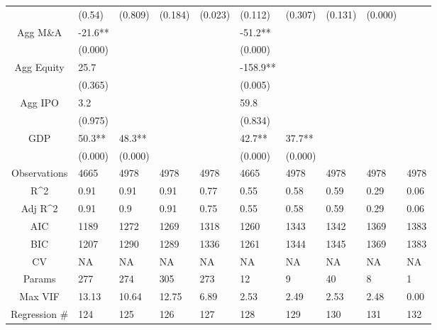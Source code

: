 \documentclass{article}
\begin{document}
\begin{table}[H]
\begin{tabular}{|clllllllll|}
   & (0.54) & (0.809) & (0.184) & (0.023) & (0.112) & (0.307) & (0.131) & (0.000) &  \\ 
  Agg M\&A & -21.6** &  &  &  & -51.2** &  &  &  &  \\ 
   & (0.000) &  &  &  & (0.000) &  &  &  &  \\ 
  Agg Equity & 25.7 &  &  &  & -158.9** &  &  &  &  \\ 
   & (0.365) &  &  &  & (0.005) &  &  &  &  \\ 
  Agg IPO & 3.2 &  &  &  & 59.8 &  &  &  &  \\ 
   & (0.975) &  &  &  & (0.834) &  &  &  &  \\ 
  GDP & 50.3** & 48.3** &  &  & 42.7** & 37.7** &  &  &  \\ 
   & (0.000) & (0.000) &  &  & (0.000) & (0.000) &  &  &  \\ 
  \hline 
 Observations & 4665 & 4978 & 4978 & 4978 & 4665 & 4978 & 4978 & 4978 & 4978 \\ 
  R^2 & 0.91 & 0.91 & 0.91 & 0.77 & 0.55 & 0.58 & 0.59 & 0.29 & 0.06 \\ 
  Adj R^2 & 0.91 & 0.9 & 0.91 & 0.75 & 0.55 & 0.58 & 0.59 & 0.29 & 0.06 \\ 
  AIC & 1189 & 1272 & 1269 & 1318 & 1260 & 1343 & 1342 & 1369 & 1383 \\ 
  BIC & 1207 & 1290 & 1289 & 1336 & 1261 & 1344 & 1345 & 1369 & 1383 \\ 
  CV & NA & NA & NA & NA & NA & NA & NA & NA & NA \\ 
  Params & 277 & 274 & 305 & 273 & 12 & 9 & 40 & 8 & 1 \\ 
  Max VIF & 13.13 & 10.64 & 12.75 & 6.89 & 2.53 & 2.49 & 2.53 & 2.48 & 0.00 \\ 
  Regression \# & 124 & 125 & 126 & 127 & 128 & 129 & 130 & 131 & 132 \\ 
   \hline
\end{tabular}
 
\end{table}
\end{document}
